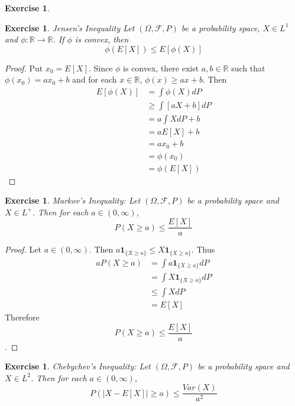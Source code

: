 \documentclass[12pt]{amsart}
\newtheorem{ex}[thm]{Exercise}
\newcommand{\Om}{\Omega}
\newcommand{\R}{\mathbb{R}}
\newcommand{\MF}{\mathcal{F}}
\begin{document}
	\begin{ex}
		
	\end{ex}
	
	\begin{ex}{Jensen's Inequality}
		Let $(\Om, \MF, P)$ be a probability space, $X \in L^1$ and $\phi:\R \rightarrow \R$. If $\phi$ is convex, then $$\phi(E[X]) \leq E[\phi(X)]$$
	\end{ex}
	
	\begin{proof}
		Put $x_0 = E[X]$. Since $\phi$ is convex, there exist $a,b \in \R$ such that $\phi(x_0) = ax_0+b$ and for each $x \in \R$, $\phi(x) \geq ax+b$. Then \begin{align*}
			E[\phi(X)] 
			&= \int\phi(X) dP \\
			&\geq \int[ aX+b ]dP \\
			&= a\int X dP +b \\
			&= aE[X] +b \\
			&= ax_0+b \\
			&= \phi(x_0) \\
			&= \phi(E[X])
		\end{align*}
	\end{proof}
	
	\begin{ex}{Markov's Inequality:}
		Let $(\Om, \MF, P)$ be a probability space and $X \in L^+$. Then for each $a \in (0,\infty)$, $$P(X \geq a) \leq \frac{E[X]}{a}$$
	\end{ex}
	
	\begin{proof}
		Let $a \in (0,\infty)$. Then $a \mathbf{1}_{\{X \geq a\}} \leq X \mathbf{1}_{\{X \geq a\}}$. Thus 
		\begin{align*}
			a P(X \geq a) 
			&= \int a \mathbf{1}_{\{X \geq a\}} dP\\
			&= \int X \mathbf{1}_{\{X \geq a\}} dP\\
			&\leq \int X dP \\
			&= E[X]
		\end{align*}
		Therefore $$P(X \geq a) \leq \frac{E[X]}{a}$$. 
	\end{proof}
	
	\begin{ex}{Chebychev's Inequality:}
		Let $(\Om, \MF, P)$ be a probability space and $X \in L^2$. Then for each $a \in (0, \infty)$, $$P(\vert X - E[X] \vert \geq a) \leq \frac{Var(X)}{a^2}$$
	\end{ex}
	
\end{document}
